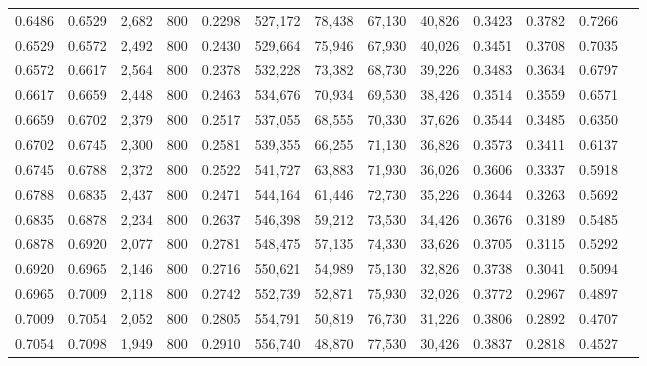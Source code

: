 \begin{tabular}{rrrrrrrrrrrrr}
0.6486 & 0.6529 &  2,682 &   800 &                                     0.2298 & 527,172 &  78,438 &  67,130 &  40,826 & 0.3423 & 0.3782 & 0.7266 \\
0.6529 & 0.6572 &  2,492 &   800 &                                     0.2430 & 529,664 &  75,946 &  67,930 &  40,026 & 0.3451 & 0.3708 & 0.7035 \\
0.6572 & 0.6617 &  2,564 &   800 &                                     0.2378 & 532,228 &  73,382 &  68,730 &  39,226 & 0.3483 & 0.3634 & 0.6797 \\
0.6617 & 0.6659 &  2,448 &   800 &                                     0.2463 & 534,676 &  70,934 &  69,530 &  38,426 & 0.3514 & 0.3559 & 0.6571 \\
0.6659 & 0.6702 &  2,379 &   800 &                                     0.2517 & 537,055 &  68,555 &  70,330 &  37,626 & 0.3544 & 0.3485 & 0.6350 \\
0.6702 & 0.6745 &  2,300 &   800 &                                     0.2581 & 539,355 &  66,255 &  71,130 &  36,826 & 0.3573 & 0.3411 & 0.6137 \\
0.6745 & 0.6788 &  2,372 &   800 &                                     0.2522 & 541,727 &  63,883 &  71,930 &  36,026 & 0.3606 & 0.3337 & 0.5918 \\
0.6788 & 0.6835 &  2,437 &   800 &                                     0.2471 & 544,164 &  61,446 &  72,730 &  35,226 & 0.3644 & 0.3263 & 0.5692 \\
0.6835 & 0.6878 &  2,234 &   800 &                                     0.2637 & 546,398 &  59,212 &  73,530 &  34,426 & 0.3676 & 0.3189 & 0.5485 \\
0.6878 & 0.6920 &  2,077 &   800 &                                     0.2781 & 548,475 &  57,135 &  74,330 &  33,626 & 0.3705 & 0.3115 & 0.5292 \\
0.6920 & 0.6965 &  2,146 &   800 &                                     0.2716 & 550,621 &  54,989 &  75,130 &  32,826 & 0.3738 & 0.3041 & 0.5094 \\
0.6965 & 0.7009 &  2,118 &   800 &                                     0.2742 & 552,739 &  52,871 &  75,930 &  32,026 & 0.3772 & 0.2967 & 0.4897 \\
0.7009 & 0.7054 &  2,052 &   800 &                                     0.2805 & 554,791 &  50,819 &  76,730 &  31,226 & 0.3806 & 0.2892 & 0.4707 \\
0.7054 & 0.7098 &  1,949 &   800 &                                     0.2910 & 556,740 &  48,870 &  77,530 &  30,426 & 0.3837 & 0.2818 & 0.4527 \\

\end{tabular}
